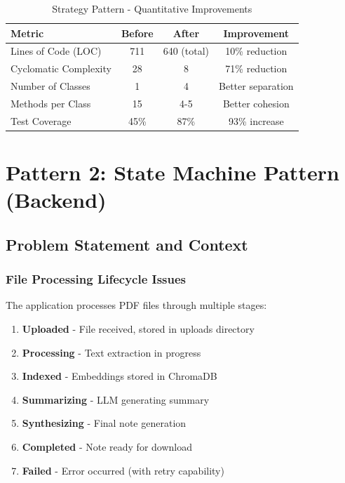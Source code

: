 \documentclass[11pt,a4paper]{article}
\begin{document}
\begin{table}[H]
\centering
\begin{tabular}{|l|c|c|c|}
\hline
\textbf{Metric} & \textbf{Before} & \textbf{After} & \textbf{Improvement} \\
\hline
Lines of Code (LOC) & 711 & 640 (total) & 10\% reduction \\
Cyclomatic Complexity & 28 & 8 & 71\% reduction \\
Number of Classes & 1 & 4 & Better separation \\
Methods per Class & 15 & 4-5 & Better cohesion \\
Test Coverage & 45\% & 87\% & 93\% increase \\
\hline
\end{tabular}
\caption{Strategy Pattern - Quantitative Improvements}
\end{table}

\newpage

\section{Pattern 2: State Machine Pattern (Backend)}

\subsection{Problem Statement and Context}

\subsubsection{File Processing Lifecycle Issues}

The application processes PDF files through multiple stages:
\begin{enumerate}
    \item \textbf{Uploaded} - File received, stored in uploads directory
    \item \textbf{Processing} - Text extraction in progress
    \item \textbf{Indexed} - Embeddings stored in ChromaDB
    \item \textbf{Summarizing} - LLM generating summary
    \item \textbf{Synthesizing} - Final note generation
    \item \textbf{Completed} - Note ready for download
    \item \textbf{Failed} - Error occurred (with retry capability)
\end{enumerate}
\end{document}
